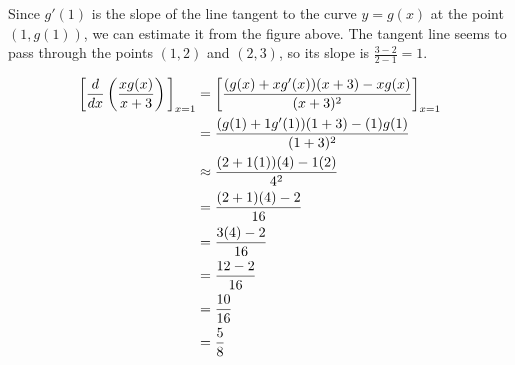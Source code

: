 \documentclass[nooutcomes,handout]{ximera}
\begin{document}
\begin{problem}
\begin{freeResponse}
		Since $g'(1)$ is the slope of the line tangent to the curve $y=g(x)$ at the point $(1,g(1))$, we can estimate it from the figure above.  The tangent line seems to pass through the points $(1,2)$ and $(2,3)$, so its slope is $\frac{3-2}{2-1}=1$.

	\begin{align*}
	\bigg[  \frac{d}{dx} \left( \frac{xg(x)}{x+3}\right) \bigg]_{x=1}&= \bigg[ \frac{(g(x)+xg'(x))(x+3)-xg(x)}{(x+3)^2} \bigg]_{x=1}\\
	&=\frac{(g(1)+1g'(1))(1+3)-(1)g(1)}{(1+3)^2} \\
	& \approx \frac{(2+1(1))(4)-1(2)}{4^2}\\
	&=\frac{(2+1)(4)-2}{16}\\
	&= \frac{3(4)-2}{16}\\
	&= \frac{12-2}{16}\\
	&= \frac{10}{16}\\
	&=\frac{5}{8}
	\end{align*}



	\end{freeResponse}

\end{problem}	
	
	
			
			
\end{document}
